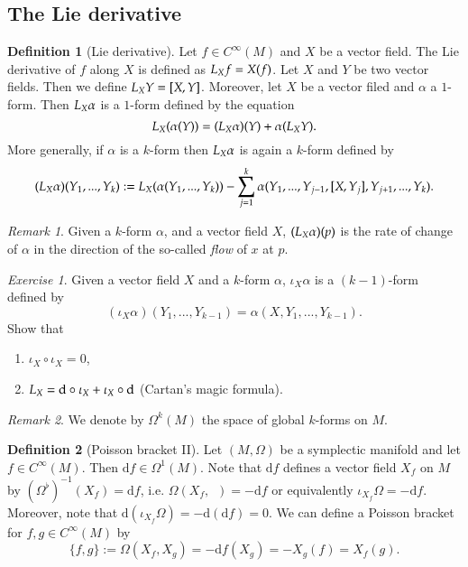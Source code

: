 \documentclass[11pt]{amsart}
\numberwithin{equation}{section}
\theoremstyle{plain}
\theoremstyle{definition}
\newtheorem{defn}{Definition}[subsection]
\theoremstyle{remark}
\newtheorem{rem}{Remark}[subsection]
\newtheorem{exe}{Exercise}[subsection]
\newcommand{\dd}{{\mathrm{d}}}
\begin{document}
\subsection{The Lie derivative}

\begin{defn}[Lie derivative]
Let $f\in C^\infty(M)$ and $X$ be a vector field. The Lie derivative of $f$ along $X$ is defined as $\emph{L}_Xf=X(f)$. Let $X$ and $Y$ be two vector fields. Then we define $\emph{L}_XY=[X,Y]$. Moreover, let $X$ be a vector filed and $\alpha$ a $1$-form. Then $\emph{L}_X\alpha$ is a $1$-form defined by the equation $$\emph{L}_X(\alpha(Y))=(\emph{L}_X\alpha)(Y)+\alpha(\emph{L}_XY).$$ More generally, if $\alpha$ is a $k$-form  then $\emph{L}_X\alpha$ is again a $k$-form defined by $$(\emph{L}_X\alpha)(Y_1,...,Y_k):=\emph{L}_X(\alpha(Y_1,...,Y_k))-\sum_{j=1}^k\alpha(Y_1,...,Y_{j-1},[X,Y_j],Y_{j+1},...,Y_k).$$
\end{defn}

\begin{rem}
Given a $k$-form $\alpha$, and a vector field $X$, $(\emph{L}_X\alpha)(p)$ is the rate of change of $\alpha$ in the direction of the so-called \emph{flow} of $x$ at $p$.
\end{rem}

\begin{exe}
Given a vector field $X$ and a $k$-form $\alpha$, $\iota_X\alpha$ is a $(k-1)$-form defined by $$(\iota_X\alpha)(Y_1,...,Y_{k-1})=\alpha(X,Y_1,...,Y_{k-1}).$$
Show that
\begin{enumerate}
\item{$\iota_X\circ\iota_X=0$,}
\item{$\emph{L}_X=\dd\circ \iota_X+\iota_X\circ\dd$ (Cartan's magic formula).}
\end{enumerate}
\end{exe}

\begin{rem}
We denote by $\Omega^k(M)$ the space of global $k$-forms on $M$.
\end{rem}

\begin{defn}[Poisson bracket II]
\label{PBII}
Let $(M,\Omega)$ be a symplectic manifold and let $f\in C^\infty(M)$. Then $\dd f\in\Omega^1(M)$. Note that $\dd f$ defines a vector field $X_f$ on $M$ by $(\Omega^\flat)^{-1}(X_f)=\dd f$, i.e. $\Omega(X_f,\enspace)=-\dd f$ or equivalently $\iota_{X_f}\Omega=-\dd f$. Moreover, note that $\dd(\iota_{X_f}\Omega)=-\dd(\dd f)=0$. We can define a Poisson bracket for $f,g\in C^\infty(M)$ by 
$$\{ f,g\}:=\Omega(X_f,X_g)=-\dd f(X_g)=-X_g(f)=X_f(g).$$
\end{defn}
\end{document}
